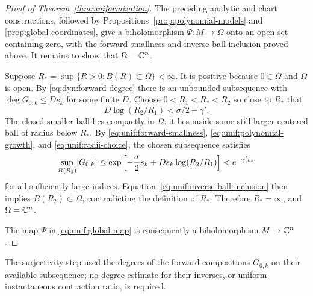 \begin{proof}[Proof of Theorem~\ref{thm:uniformization}]
The preceding analytic and chart constructions, followed by
Propositions~\ref{prop:polynomial-models} and
\ref{prop:global-coordinates}, give a biholomorphism $\Psi:M\to\Omega$
onto an open set containing zero, with the forward smallness and
inverse-ball inclusion proved above.  It remains to show that
$\Omega=\mathbb C^n$.

Suppose
$R_*=\sup\{R>0:B(R)\subset\Omega\}<\infty$.
It is positive because $0\in\Omega$ and $\Omega$ is open.
By \eqref{eq:dyn:forward-degree} there is an unbounded subsequence
with $\deg G_{0,k}\le Ds_k$ for some finite $D$.
Choose
$0<R_1<R_*<R_2$ so close to $R_*$ that
\begin{equation}
 D\log(R_2/R_1)<\sigma/2-\gamma'.
 \label{eq:unif:radii-choice}
\end{equation}
The closed smaller ball lies compactly in $\Omega$: it lies inside
some still larger centered ball of radius below $R_*$.
By \eqref{eq:unif:forward-smallness},
\eqref{eq:unif:polynomial-growth}, and
\eqref{eq:unif:radii-choice}, the chosen subsequence satisfies
\[
 \sup_{B(R_2)}\lvert G_{0,k}\rvert
 \le \exp\left[
   -\frac{\sigma}{2}s_k+Ds_k\log(R_2/R_1)\right]
 < e^{-\gamma's_k}
\]
for all sufficiently large indices.
Equation~\eqref{eq:unif:inverse-ball-inclusion} then implies
$B(R_2)\subset\Omega$, contradicting the definition of $R_*$.
Therefore $R_*=\infty$, and $\Omega=\mathbb C^n$.

The map $\Psi$ in \eqref{eq:unif:global-map} is consequently a
biholomorphism $M\to\mathbb C^n$.
\end{proof}

The surjectivity step used the degrees
of the forward compositions $G_{0,k}$ on their available
subsequence; no degree estimate for their inverses, or uniform
instantaneous contraction ratio, is required.
